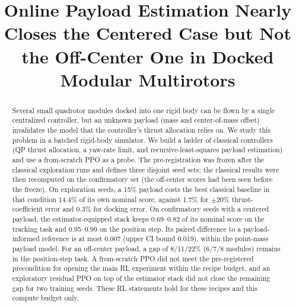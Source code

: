 \documentclass[conference]{IEEEtran}
\begin{document}
\title{Online Payload Estimation Nearly Closes the Centered Case but Not the Off-Center One in Docked Modular Multirotors}

\author{
}

\maketitle

\begin{abstract}
Several small quadrotor modules docked into one rigid body can be flown by a single centralized controller, but an unknown payload (mass and center-of-mass offset) invalidates the model that the controller's thrust allocation relies on.
We study this problem in a batched rigid-body simulator.
We build a ladder of classical controllers (QP thrust allocation, a yaw-rate limit, and recursive-least-squares payload estimation) and use a from-scratch PPO as a probe.
The pre-registration was frozen after the classical exploration runs and defines three disjoint seed sets; the classical results were then recomputed on the confirmatory set (the off-center scores had been seen before the freeze).
On exploration seeds, a 15\% payload costs the best classical baseline in that condition 14.4\% of its own nominal score, against 1.7\% for $\pm20\%$ thrust-coefficient error and 0.3\% for docking error. %
On confirmatory seeds with a centered payload, the estimator-equipped stack keeps 0.69--0.82 of its nominal score on the tracking task and 0.95--0.99 on the position step. %
Its paired difference to a payload-informed reference is at most 0.007 (upper CI bound 0.019), within the point-mass payload model. %
For an off-center payload, a gap of 8/11/22\% (6/7/8 modules) remains in the position-step task. %
A from-scratch PPO did not meet the pre-registered precondition for opening the main RL experiment within the recipe budget, and an exploratory residual PPO on top of the estimator stack did not close the remaining gap for two training seeds.
These RL statements hold for these recipes and this compute budget only.
\end{abstract}
\end{document}

